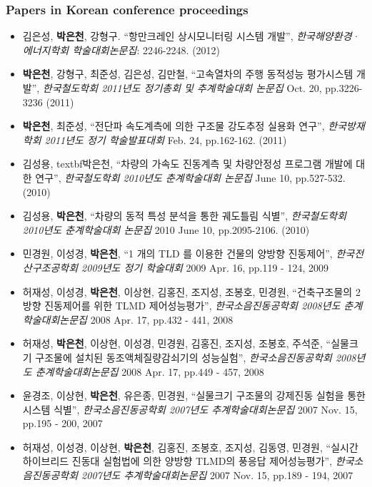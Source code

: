 \subsubsection*{Papers in Korean conference proceedings}
\begin{itemize}
\item
  김은성, \textbf{박은천}, 강형구. ``항만크레인 상시모니터링 시스템 개발'', \emph{한국해양환경· 에너지학회 학술대회논문집}: 2246-2248. (2012)
\item
  \textbf{박은천}, 강형구, 최준성, 김은성, 김만철, ``고속열차의 주행
  동적성능 평가시스템 개발'', \emph{한국철도학회 2011년도 정기총회 및
  추계학술대회 논문집} Oct. 20, pp.3226-3236 (2011)
\item
  \textbf{박은천}, 최준성, ``전단파 속도계측에 의한 구조물 강도추정
  실용화 연구'', \emph{한국방재학회 2011년도 정기 학술발표대회} Feb. 24,
  pp.162-162. (2011)
\item
  김성용, textbf{박은천}, ``차량의 가속도 진동계측 및 차량안정성
  프로그램 개발에 대한 연구'', \emph{한국철도학회 2010년도 춘계학술대회
  논문집} June 10, pp.527-532. (2010)
\item
  김성용, \textbf{박은천}, ``차량의 동적 특성 분석을 통한 궤도틀림
  식별'', \emph{한국철도학회 2010년도 춘계학술대회 논문집} 2010 June 10,
  pp.2095-2106. (2010)
\item
  민경원, 이성경, \textbf{박은천}, ``1 개의 TLD 를 이용한 건물의 양방향
  진동제어'', \emph{한국전산구조공학회 2009년도 정기 학술대회} 2009 Apr.
  16, pp.119 - 124, 2009
\item
  허재성, 이성경, \textbf{박은천}, 이상현, 김홍진, 조지성, 조봉호,
  민경원, ``건축구조물의 2방향 진동제어를 위한 TLMD 제어성능평가'',
  \emph{한국소음진동공학회 2008년도 춘계학술대회논문집} 2008 Apr. 17,
  pp.432 - 441, 2008
\item
  허재성, \textbf{박은천}, 이상현, 이성경, 민경원, 김홍진, 조지성,
  조봉호, 주석준, ``실물크기 구조물에 설치된 동조액체질량감쇠기의
  성능실험'', \emph{한국소음진동공학회 2008년도 춘계학술대회논문집} 2008
  Apr. 17, pp.449 - 457, 2008
\item
  윤경조, 이상현, \textbf{박은천}, 유은종, 민경원, ``실물크기 구조물의
  강제진동 실험을 통한 시스템 식별'', \emph{한국소음진동공학회 2007년도
  추계학술대회논문집} 2007 Nov. 15, pp.195 - 200, 2007
\item
  허재성, 이성경, 이상현, \textbf{박은천}, 김홍진, 조봉호, 조지성,
  김동영, 민경원, ``실시간 하이브리드 진동대 실험법에 의한 양방향 TLMD의
  풍응답 제어성능평가'', \emph{한국소음진동공학회 2007년도
  추계학술대회논문집} 2007 Nov. 15, pp.189 - 194, 2007

\end{itemize}
